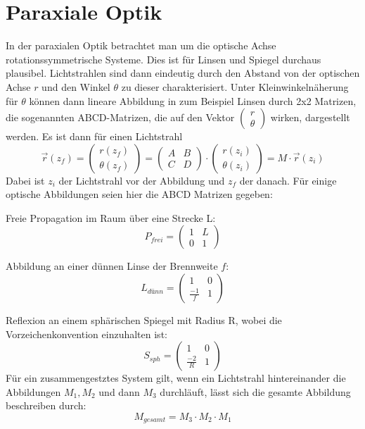 \documentclass[twoside,colorback,accentcolor=tud4c,11pt]{tudreport}
\begin{document}
\section{Paraxiale Optik}
		In der paraxialen Optik betrachtet man um die optische Achse rotationssymmetrische Systeme. Dies ist für Linsen und Spiegel durchaus plausibel. Lichtstrahlen sind dann eindeutig durch den Abstand von der optischen Achse $r$ und den Winkel $\theta$ zu dieser charakterisiert. Unter Kleinwinkelnäherung für $\theta$ können dann lineare Abbildung in zum Beispiel Linsen durch 2x2 Matrizen, die sogenannten ABCD-Matrizen, die auf den Vektor $\begin{pmatrix}
		r \\ \theta
		\end{pmatrix}$ wirken, dargestellt werden.
		Es ist dann für einen Lichtstrahl
		\[
		\vec{r} \left(z_f\right) = \begin{pmatrix}
		r\left(z_f\right) \\ \theta\left(z_f\right)
		\end{pmatrix} = 
		\begin{pmatrix}
		A & B \\
		C & D   \end{pmatrix} \cdot \begin{pmatrix}
		r\left(z_i\right) \\ \theta\left(z_i\right)
		\end{pmatrix} = M \cdot \vec{r} \left(z_i\right)		
		\]
		Dabei ist $z_i$ der Lichtstrahl vor der Abbildung und $z_f$ der danach.
		Für einige optische Abbildungen seien hier die ABCD Matrizen gegeben:
		
		Freie Propagation im Raum über eine Strecke L:
		\[
		P_{frei} =
		\begin{pmatrix}
		1 & L \\
		0 & 1   \end{pmatrix}
		\]
		
		Abbildung an einer dünnen Linse der Brennweite $f$:
		\[
		L_{dünn} =
		\begin{pmatrix}
		1 & 0 \\
		\frac{-1}{f} & 1   \end{pmatrix}
		\]
		
		Reflexion an einem sphärischen Spiegel mit Radius R, wobei die Vorzeichenkonvention einzuhalten ist:
		\[
		S_{sph} =
		\begin{pmatrix}
		1 & 0 \\
		\frac{-2}{R} & 1   \end{pmatrix}
		\]
		Für ein zusammengestztes System gilt, wenn ein Lichtstrahl hintereinander die Abbildungen $M_1, M_2$ und dann $M_3$ durchläuft, lässt sich die gesamte Abbildung beschreiben durch:
		\[M_{gesamt} = M_3 \cdot M_2 \cdot M_1\]
		
\end{document}
